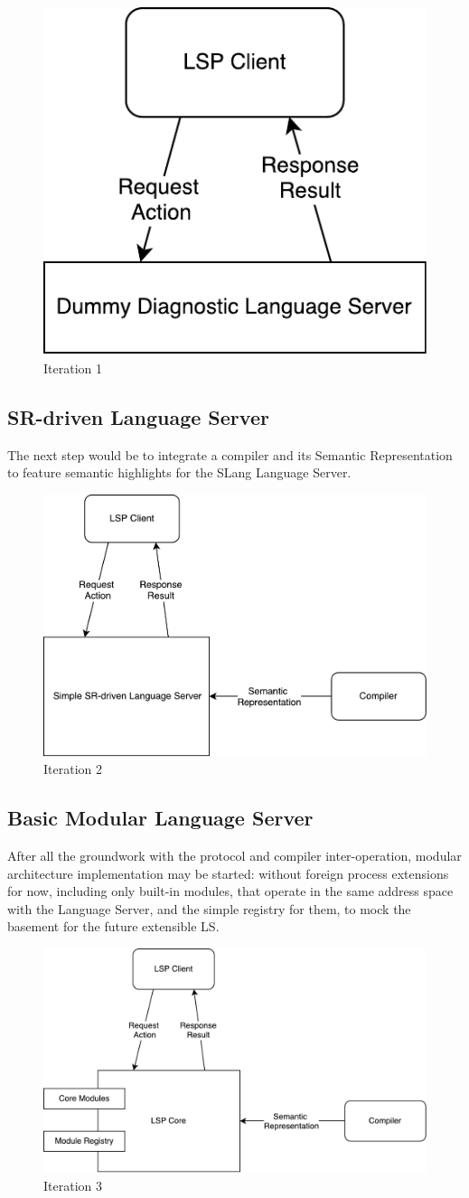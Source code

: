 \begin{figure}[H]
    \centering
    \includegraphics[width=.3\textwidth]{figs/ls_iteration_1.pdf}
    \caption{Iteration 1}
\end{figure}

\newpage
\subsection{SR-driven Language Server}
The next step would be to integrate a compiler and its Semantic Representation
to feature semantic highlights for the SLang Language Server.
\begin{figure}[H]
    \centering
    \includegraphics[width=.6\textwidth]{figs/ls_iteration_2.pdf}
    \caption{Iteration 2}
\end{figure}

\subsection{Basic Modular Language Server}
After all the groundwork with the protocol and compiler inter-operation, 
modular architecture implementation may be started: without foreign process extensions for now,
including only built-in modules, that operate in the same address space with the Language Server,
and the simple registry for them, to mock the basement for the future extensible LS.

\begin{figure}[H]
    \centering
    \includegraphics[width=.6\textwidth]{figs/ls_iteration_3.pdf}
    \caption{Iteration 3}
\end{figure}

